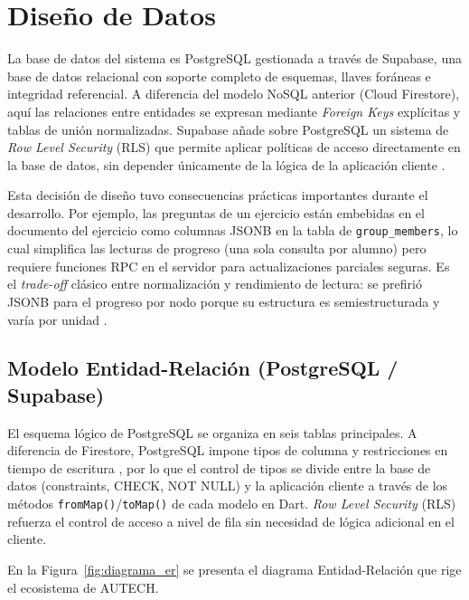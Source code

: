 \section{Diseño de Datos}
\label{sec:diseno_datos}

La base de datos del sistema es PostgreSQL gestionada a través de Supabase, una base de datos
relacional con soporte completo de esquemas, llaves foráneas e integridad referencial. A diferencia
del modelo NoSQL anterior (Cloud Firestore), aquí las relaciones entre entidades se expresan
mediante \textit{Foreign Keys} explícitas y tablas de unión normalizadas. Supabase añade sobre
PostgreSQL un sistema de \textit{Row Level Security} (RLS) que permite aplicar políticas de acceso
directamente en la base de datos, sin depender únicamente de la lógica de la aplicación cliente
\cite{google2024b}\cite{supabase2024}.

Esta decisión de diseño tuvo consecuencias prácticas importantes durante el desarrollo. Por ejemplo,
las preguntas de un ejercicio están embebidas en el documento del ejercicio como columnas JSONB en
la tabla de \texttt{group\_members}, lo cual simplifica las lecturas de progreso (una sola consulta
por alumno) pero requiere funciones RPC en el servidor para actualizaciones parciales seguras. Es el
\textit{trade-off} clásico entre normalización y rendimiento de lectura: se prefirió JSONB para el
progreso por nodo porque su estructura es semiestructurada y varía por unidad \cite{fowler2013}.

\newpage
\subsection{Modelo Entidad-Relación (PostgreSQL / Supabase)}
\label{subsec:mer}

El esquema lógico de PostgreSQL se organiza en seis tablas principales. A diferencia de Firestore,
PostgreSQL impone tipos de columna y restricciones en tiempo de escritura \cite{google2024b}, por lo
que el control de tipos se divide entre la base de datos (constraints, CHECK, NOT NULL) y la
aplicación cliente a través de los métodos \texttt{fromMap()}/\texttt{toMap()} de cada modelo en
Dart. \textit{Row Level Security} (RLS) refuerza el control de acceso a nivel de fila sin
necesidad de lógica adicional en el cliente.

En la Figura~\ref{fig:diagrama_er} se presenta el diagrama
Entidad-Relación que rige el ecosistema de AUTECH.

